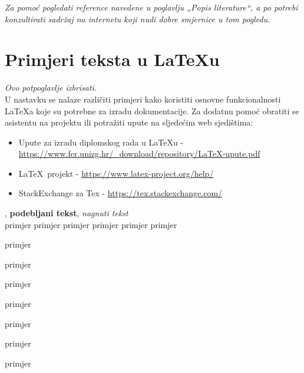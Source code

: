 		\textit{Za pomoć pogledati reference navedene u poglavlju „Popis literature“, a po potrebi konzultirati sadržaj na internetu koji nudi dobre smjernice u tom pogledu.}
		\eject
		
		\section{Primjeri teksta u \LaTeX u}
		
		\textit{Ovo potpoglavlje izbrisati.}\\

		U nastavku se nalaze različiti primjeri kako koristiti osnovne funkcionalnosti \LaTeX a koje su potrebne za izradu dokumentacije. Za dodatnu pomoć obratiti se asistentu na projektu ili potražiti upute na sljedećim web sjedištima:
		\begin{itemize}
			\item Upute za izradu diplomskog rada u \LaTeX u - \url{https://www.fer.unizg.hr/_download/repository/LaTeX-upute.pdf}
			\item \LaTeX\ projekt - \url{https://www.latex-project.org/help/}
			\item StackExchange za Tex - \url{https://tex.stackexchange.com/}\\
		
		\end{itemize} 	


		
		\noindent {}, \textbf{podebljani tekst}, 	\textit{nagnuti tekst}\\
		\noindent \normalsize primjer \large primjer \Large primjer \LARGE {primjer} \huge {primjer} \Huge primjer \normalsize
				
		\begin{packed_item}
			
			\item  primjer
			\item  primjer
			\item  primjer
			\item[] \begin{packed_enum}
				\item primjer
				\item[] \begin{packed_enum}
					\item[1.a] primjer
					\item[b] primjer
				\end{packed_enum}
				\item primjer
			\end{packed_enum}
			
		\end{packed_item}
		
